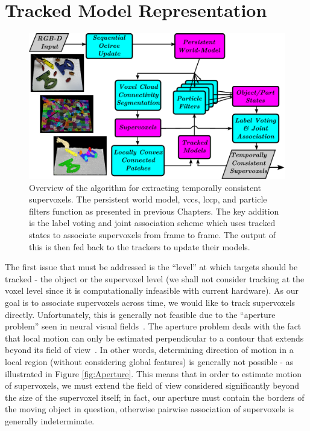 \section{Tracked Model Representation}
\begin{figure}[!t]
  \includegraphics[width=\linewidth]{figures/Tracking/FlowChart.pdf}
  \caption[Algorithm Overview]{Overview of the algorithm for extracting temporally consistent supervoxels. The persistent world model, \gls{vccs}, \gls{lccp}, and particle filters function as presented in previous Chapters. The key addition is the label voting and joint association scheme which uses tracked states to associate supervoxels from frame to frame. The output of this is then fed back to the trackers to update their models. }
  \label{fig:AlgFlowChart}
\end{figure}
The first issue that must be addressed is the ``level'' at which targets should be tracked - the object or the supervoxel level (we shall not consider tracking at the voxel level since it is computationally infeasible with current hardware). As our goal is to associate supervoxels across time, we would like to track supervoxels directly. Unfortunately, this is generally not feasible due to the ``aperture problem'' seen in neural visual fields~\cite{MarrApertureProblem}. The aperture problem deals with the fact that local motion can only be estimated perpendicular to a contour that extends beyond its field of view~\cite{shimojo1989}. In other words, determining direction of motion in a local region (without considering global features) is generally not possible - as illustrated in Figure \ref{fig:Aperture}. This means that in order to estimate motion of supervoxels, we must extend the field of view considered significantly beyond the size of the supervoxel itself; in fact, our aperture must contain the borders of the moving object in question, otherwise pairwise association of supervoxels is generally indeterminate. 

